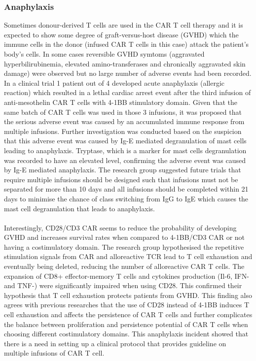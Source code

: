 \documentclass[12pt,oneside]{report}
\begin{document}
\subsubsection{Anaphylaxis} 
Sometimes donour-derived T cells are used in the CAR T cell therapy and it is expected to show some degree of graft-versus-host disease (GVHD) which the immune cells in the donor (infused CAR T cells in this case) attack the patient's body's cells. In some cases reversible GVHD symtoms (aggravated hyperbilirubinemia, elevated amino-transferases and chronically aggravated skin damage) were observed \citep{allo-3} but no large number of adverse events had been recorded. In a clinical trial 1 patient out of 4 developed acute anaphylaxis (allergic reaction) which resulted in a lethal cardiac arrest event after the third infusion of anti-mesothelin CAR T cells with 4-1BB stimulatory domain\citep{allo-4}. Given that the same batch of CAR T cells was used in those 3 infusions, it was proposed that the serious adverse event was caused by an accumulated immune response from multiple infusions\citep{allo-4}. Further investigation was conducted based on the suspicion that this adverse event was caused by Ig-E mediated degranulation of mast cells leading to anaphylaxis. Tryptase, which is a marker for mast cells degranulation was recorded to have an elevated level\citep{allo-4}, confirming the adverse event was caused by Ig-E mediated anaphylaxis. The research group suggested future trials that require multiple infusions should be designed such that infusions must not be separated for more than 10 days and all infusions should be completed within 21 days to minimise the chance of class switching from IgG to IgE\citep{allo-4} which causes the mast cell degranulation that leads to anaphylaxis. 
\\\\Interestingly, CD28/CD3\textzeta{} CAR seems to reduce the probability of developing GVHD and increases survival rates when compared to 4-1BB/CD3\textzeta{} CAR or not having a costimulatory domain\citep{allo-5}. The research group hypothesised the repetitive stimulation signals from CAR and alloreactive TCR lead to T cell exhaustion and eventually being deleted, reducing the number of alloreactive CAR T cells\citep{allo-5}. The expansion of CD8+ effector-memory T cells and cytokines production (Il-6, IFN-\textgamma{} and TNF-\textalpha) were significantly impaired when using CD28\citep{allo-5}. This confirmed their hypothesis that T cell exhaustion protects patients from GVHD. This finding also agrees with previous researches that the use of CD28 instead of 4-1BB induces T cell exhaustion and affects the persistence of CAR T cells\citep{CD28-2, CD28-3, CD28-4} and further complicates the balance between proliferation and persistence potential of CAR T cells when choosing different costimulatory domains. This anaphylaxis incident showed that there is a need in setting up a clinical protocol that provides guideline on multiple infusions of CAR T cell. 
\end{document}
